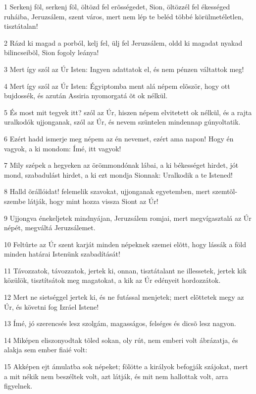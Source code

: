 \par 1 Serkenj föl, serkenj föl, öltözd fel erõsségedet, Sion, öltözzél fel ékességed ruháiba, Jeruzsálem, szent város, mert nem lép te beléd többé körülmetéletlen, tisztátalan!
\par 2 Rázd ki magad a porból, kelj fel, ülj fel Jeruzsálem, oldd ki magadat nyakad bilincseibõl, Sion fogoly leánya!
\par 3 Mert így szól az Úr Isten: Ingyen adattatok el, és nem pénzen váltattok meg!
\par 4 Mert így szól az Úr Isten: Égyiptomba ment alá népem elõször, hogy ott bujdossék, és azután Assiria nyomorgatá õt ok nélkül.
\par 5 És most mit tegyek itt? szól az Úr, hiszen népem elvitetett ok nélkül, és a rajta uralkodók ujjonganak, szól az Úr, és nevem szüntelen mindennap gúnyoltatik.
\par 6 Ezért hadd ismerje meg népem az én nevemet, ezért ama napon! Hogy én vagyok, a ki mondom: Ímé, itt vagyok!
\par 7 Mily szépek a hegyeken az örömmondónak lábai, a ki békességet hirdet, jót mond, szabadulást hirdet, a ki ezt mondja Sionnak: Uralkodik a te Istened!
\par 8 Halld õrállóidat! felemelik szavokat, ujjonganak egyetemben, mert szemtõl-szembe látják, hogy mint hozza vissza Siont az Úr!
\par 9 Ujjongva énekeljetek mindnyájan, Jeruzsálem romjai, mert megvígasztalá az Úr népét, megváltá Jeruzsálemet.
\par 10 Feltûrte az Úr szent karját minden népeknek szemei elõtt, hogy lássák a föld minden határai Istenünk szabadítását!
\par 11 Távozzatok, távozzatok, jertek ki, onnan, tisztátalant ne illessetek, jertek kik közülök, tisztítsátok meg magatokat, a kik az Úr edényeit hordozzátok.
\par 12 Mert ne sietséggel jertek ki, és ne futással menjetek; mert elõttetek megy az Úr, és követni fog Izráel Istene!
\par 13 Ímé, jó szerencsés lesz szolgám, magasságos, felséges és dicsõ lesz nagyon.
\par 14 Miképen eliszonyodtak tõled sokan, oly rút, nem emberi volt ábrázatja, és alakja sem ember fiaié volt:
\par 15 Akképen ejt ámulatba sok népeket; fölötte a királyok befogják szájokat, mert a mit nékik nem beszéltek volt, azt látják, és mit nem hallottak volt, arra figyelnek.

